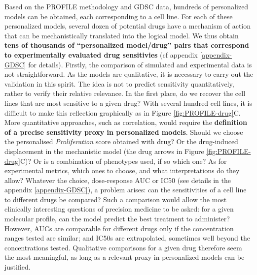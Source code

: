 \documentclass[a4paper,12pt,twoside,onecolumn,openright,final,oldfontcommands]{memoir}
\begin{document}
Based on the PROFILE methodology and GDSC data, hundreds of personalized
models can be obtained, each corresponding to a cell line. For each of
these personalized models, several dozen of potential drugs have a
mechanism of action that can be mechanistically translated into the
logical model. We thus obtain \textbf{tens of thousands of
``personalized model/drug'' pairs that correspond to experimentally
evaluated drug sensitivies} (cf appendix \ref{appendix-GDSC} for
details). Firstly, the comparison of simulated and experimental data is
not straightforward. As the models are qualitative, it is necessary to
carry out the validation in this spirit. The idea is not to predict
sensitivity quantitatively, rather to verify their relative relevance.
In the first place, do we recover the cell lines that are most sensitive
to a given drug? With several hundred cell lines, it is difficult to
make this reflection graphically as in Figure \ref{fig:PROFILE-drug}C.
More quantitative approaches, such as correlation, would require the
\textbf{definition of a precise sensitivity proxy in personalized
models}. Should we choose the personalised \emph{Proliferation} score
obtained with drug? Or the drug-induced displacement in the mechanistic
model (the drug arrows in Figure \ref{fig:PROFILE-drug}C)? Or is a
combination of phenotypes used, if so which one? As for experimental
metrics, which ones to choose, and what interpretations do they allow?
Whatever the choice, dose-response AUC or IC50 (see details in the
appendix \ref{appendix-GDSC}), a problem arises: can the sensitivities
of a cell line to different drugs be compared? Such a comparison would
allow the most clinically interesting questions of precision medicine to
be asked: for a given molecular profile, can the model predict the best
treatment to administer? However, AUCs are comparable for different
drugs only if the concentration ranges tested are similar; and IC50s are
extrapolated, sometimes well beyond the concentrations tested.
Qualitative comparisons for a given drug therefore seem the most
meaningful, as long as a relevant proxy in personalized models can be
justified.
\end{document}
